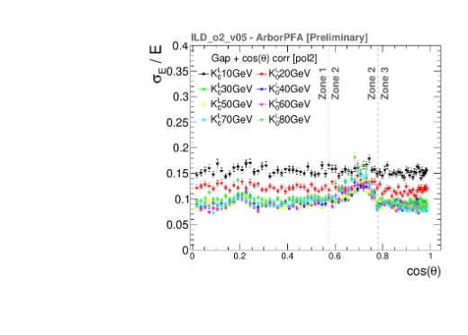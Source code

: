 \documentclass[8pt]{beamer}
\begin{document}
\begin{frame}
\begin{minipage}{0.49\linewidth}
\begin{center}
        \includegraphics[width=0.75\linewidth]{EResCorrThetaGapO2_thesis.pdf}
      \end{center}
    \end{minipage}
  \end{frame}
\end{document}
